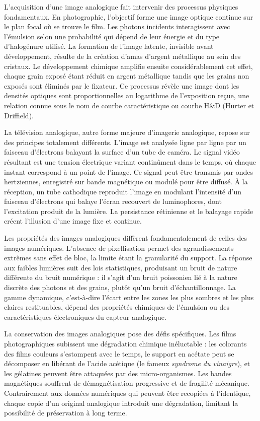 L'acquisition d'une image analogique fait intervenir des processus physiques fondamentaux. En photographie, l'objectif forme une image optique continue sur le plan focal où se trouve le film. Les photons incidents interagissent avec l'émulsion selon une probabilité qui dépend de leur énergie et du type d'halogénure utilisé. La formation de l'image latente, invisible avant développement, résulte de la création d'amas d'argent métallique au sein des cristaux. Le développement chimique amplifie ensuite considérablement cet effet, chaque grain exposé étant réduit en argent métallique tandis que les grains non exposés sont éliminés par le fixateur. Ce processus révèle une image dont les densités optiques sont proportionnelles au logarithme de l'exposition reçue, une relation connue sous le nom de courbe caractéristique ou courbe H\&D (Hurter et Driffield).

La télévision analogique, autre forme majeure d'imagerie analogique, repose sur des principes totalement différents. L'image est analysée ligne par ligne par un faisceau d'électrons balayant la surface d'un tube de caméra. Le signal vidéo résultant est une tension électrique variant continûment dans le temps, où chaque instant correspond à un point de l'image. Ce signal peut être transmis par ondes hertziennes, enregistré sur bande magnétique ou modulé pour être diffusé. À la réception, un tube cathodique reproduit l'image en modulant l'intensité d'un faisceau d'électrons qui balaye l'écran recouvert de luminophores, dont l'excitation produit de la lumière. La persistance rétinienne et le balayage rapide créent l'illusion d'une image fixe et continue.

Les propriétés des images analogiques diffèrent fondamentalement de celles des images numériques. L'absence de pixellisation permet des agrandissements extrêmes sans effet de bloc, la limite étant la granularité du support. La réponse aux faibles lumières suit des lois statistiques, produisant un bruit de nature différente du bruit numérique : il s'agit d'un bruit poissonien lié à la nature discrète des photons et des grains, plutôt qu'un bruit d'échantillonnage. La gamme dynamique, c'est-à-dire l'écart entre les zones les plus sombres et les plus claires restituables, dépend des propriétés chimiques de l'émulsion ou des caractéristiques électroniques du capteur analogique.

La conservation des images analogiques pose des défis spécifiques. Les films photographiques subissent une dégradation chimique inéluctable : les colorants des films couleurs s'estompent avec le temps, le support en acétate peut se décomposer en libérant de l'acide acétique (le fameux \textit{syndrome du vinaigre}), et les gélatines peuvent être attaquées par des micro-organismes. Les bandes magnétiques souffrent de démagnétisation progressive et de fragilité mécanique. Contrairement aux données numériques qui peuvent être recopiées à l'identique, chaque copie d'un original analogique introduit une dégradation, limitant la possibilité de préservation à long terme.

